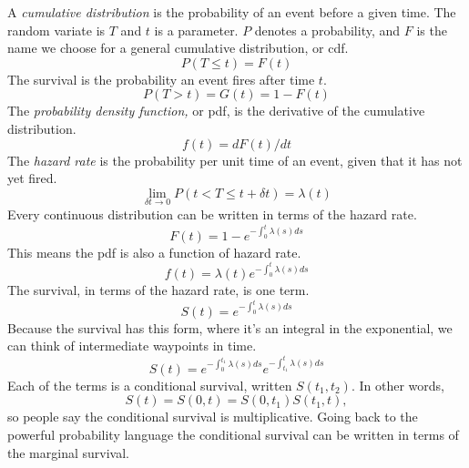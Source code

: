 \documentclass{article}
\begin{document}
A \emph{cumulative distribution} is the probability of an event before a given time. The random variate is $T$ and $t$ is a parameter. $P$ denotes a probability, and $F$ is the name we choose for a general cumulative distribution, or cdf.
\begin{equation}
  P(T \le t) = F(t)
\end{equation}
The survival is the probability an event fires after time $t$.
\begin{equation}
  P(T > t) = G(t) = 1 - F(t)
\end{equation}
The \emph{probability density function,} or pdf, is the derivative of the cumulative distribution.
\begin{equation}
  f(t) = dF(t)/dt
\end{equation}
The \emph{hazard rate} is the probability per unit time of an event, given that it has not yet fired.
\begin{equation}
\lim_{\delta t\rightarrow 0} P(t < T\le t + \delta t) = \lambda(t)
\end{equation}
Every continuous distribution can be written in terms of the hazard rate.
\begin{equation}
F(t) = 1 - e^{-\int_0^t\lambda(s)ds}
\end{equation}
This means the pdf is also a function of hazard rate.
\begin{equation}
f(t) = \lambda(t)e^{-\int_0^t\lambda(s)ds}
\end{equation}
The survival, in terms of the hazard rate, is one term.
\begin{equation}
S(t)=e^{-\int_0^t\lambda(s)ds}
\end{equation}
Because the survival has this form, where it's an integral in the exponential, we can think of intermediate waypoints in time.
\begin{equation}
	S(t)=e^{-\int_0^{t_1}\lambda(s)ds}e^{-\int_{t_1}^t\lambda(s)ds}
\end{equation}
Each of the terms is a conditional survival, written $S(t_1,t_2)$. In other words,
\begin{equation}
	S(t) = S(0, t) = S(0, t_1)S(t_1,t),
\end{equation}
so people say the conditional survival is multiplicative. Going back to the powerful probability language the conditional survival can be written in terms of the marginal survival.
\end{document}
